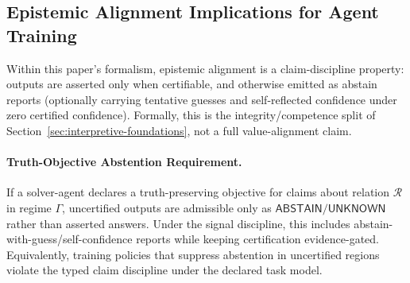 \subsection*{Epistemic Alignment Implications for Agent Training}

Within this paper's formalism, epistemic alignment is a claim-discipline property: outputs are asserted only when certifiable, and otherwise emitted as abstain reports (optionally carrying tentative guesses and self-reflected confidence under zero certified confidence).
Formally, this is the integrity/competence split of Section~\ref{sec:interpretive-foundations}, not a full value-alignment claim.

\paragraph{Truth-Objective Abstention Requirement.}
If a solver-agent declares a truth-preserving objective for claims about relation $\mathcal{R}$ in regime $\Gamma$, uncertified outputs are admissible only as $\mathsf{ABSTAIN}/\mathsf{UNKNOWN}$ rather than asserted answers.
Under the signal discipline, this includes abstain-with-guess/self-confidence reports while keeping certification evidence-gated.
Equivalently, training policies that suppress abstention in uncertified regions violate the typed claim discipline under the declared task model.

